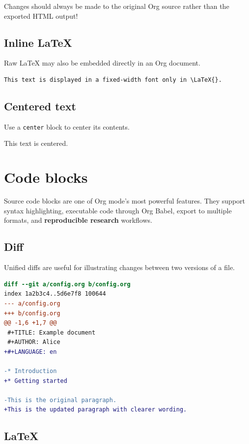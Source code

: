 \documentclass{mcreport}
\begin{document}
Changes should always be made to the original Org source rather than the
exported HTML output!
\subsection{Inline \LaTeX{}}
\label{sec:orgb5804a0}

Raw \LaTeX{} may also be embedded directly in an Org document.

\begin{verbatim}
This text is displayed in a fixed-width font only in \LaTeX{}.
\end{verbatim}
\subsection{Centered text}
\label{sec:orgaffb413}

Use a \lstinline|center| block to center its contents.

\begin{center}
This text is centered.
\end{center}
\section{Code blocks}
\label{sec:org540ceb3}

Source code blocks are one of Org mode's most powerful features. They support
syntax highlighting, executable code through Org Babel, export to multiple
formats, and \textbf{reproducible research} workflows.
\subsection{Diff}
\label{sec:orgee031b4}

Unified diffs are useful for illustrating changes between two versions of
a file.

\begin{lstlisting}[language=diff,numbers=none]
diff --git a/config.org b/config.org
index 1a2b3c4..5d6e7f8 100644
--- a/config.org
+++ b/config.org
@@ -1,6 +1,7 @@
 #+TITLE: Example document
 #+AUTHOR: Alice
+#+LANGUAGE: en

-* Introduction
+* Getting started

-This is the original paragraph.
+This is the updated paragraph with clearer wording.
\end{lstlisting}
\subsection{\LaTeX{}}
\label{sec:org844694f}
\end{document}
